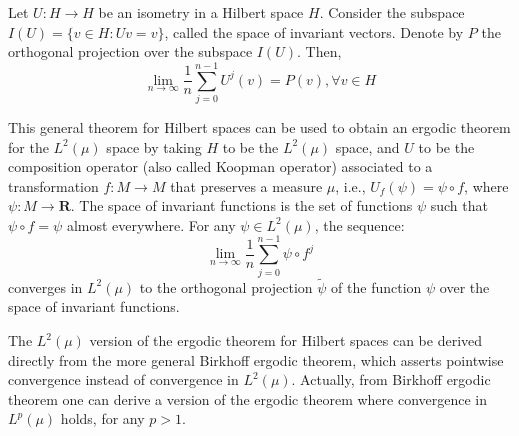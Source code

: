 \documentclass[12pt]{article}
\begin{document}
Let $U:H\rightarrow H$ be an isometry in a Hilbert space $H$. Consider the subspace $I(U)=\{ v \in H: Uv=v \}$, called the space of invariant vectors. Denote by $P$ the orthogonal projection over the subspace $I(U)$. Then,
$$\lim_{n\rightarrow \infty} \frac{1}{n} \sum_{j=0}^{n-1} U^j(v)=P(v), \forall v \in H$$

This general theorem for Hilbert spaces can be used to obtain an ergodic theorem for the $L^2(\mu)$ space by taking $H$ to be the $L^2(\mu)$ space, and $U$ to be the composition operator (also called Koopman operator) associated to a transformation $f:M\rightarrow M$ that preserves a measure $\mu$, i.e., $U_f(\psi)=\psi \circ f$, where $\psi:M\rightarrow \textbf{R}$. The space of invariant functions is the set of functions $\psi$ such that $\psi \circ f = \psi$ almost everywhere. For any $\psi \in L^2(\mu)$, the sequence:
$$\lim_{n\rightarrow \infty} \frac{1}{n} \sum_{j=0}^{n-1} \psi \circ f^j$$
converges in $L^2(\mu)$ to the orthogonal projection $\tilde{\psi}$ of the function $\psi$ over the space of invariant functions.

The $L^2(\mu)$ version of the ergodic theorem for Hilbert spaces can be derived directly from the more general Birkhoff ergodic theorem, which asserts pointwise convergence instead of convergence in $L^2(\mu)$. Actually, from Birkhoff ergodic theorem one can derive a version of the ergodic theorem where convergence in $L^p(\mu)$ holds, for any $p> 1$.
\end{document}
